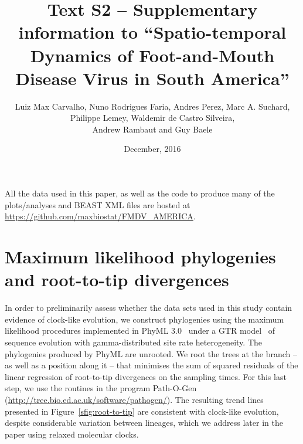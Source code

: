 \documentclass[a4paper,10pt]{article}
\title{Text S2 -- Supplementary information to ``Spatio-temporal Dynamics of Foot-and-Mouth Disease Virus in South America''}
\author{
Luiz Max Carvalho, Nuno Rodrigues Faria, Andres Perez,
Marc A. Suchard, Philippe Lemey, Waldemir de Castro Silveira,\\
Andrew Rambaut and Guy Baele
}
\date{December, 2016}
\begin{document}
\maketitle

All the data used in this paper, as well as the code to produce many of the plots/analyses and BEAST XML files are hosted at \url{https://github.com/maxbiostat/FMDV_AMERICA}.

\section*{Maximum likelihood phylogenies and root-to-tip divergences}

In order to preliminarily assess whether the data sets used in this study contain evidence of clock-like evolution, we construct phylogenies using the maximum likelihood procedures implemented in PhyML 3.0~\cite{M-phyml} under a GTR model~\cite{M-Tavare1986} of sequence evolution with gamma-distributed site rate heterogeneity.
The phylogenies produced by PhyML are unrooted.
We root the trees at the branch -- as well as a position along it -- that minimises the sum of squared residuals of the linear regression of root-to-tip divergences on the sampling times.
For this last step, we use the routines in the program Path-O-Gen (\url{http://tree.bio.ed.ac.uk/software/pathogen/}).
The resulting trend lines presented in Figure~\ref{sfig:root-to-tip} are consistent with clock-like evolution, despite considerable variation between lineages, which we address later in the paper using relaxed molecular clocks.
\end{document}
